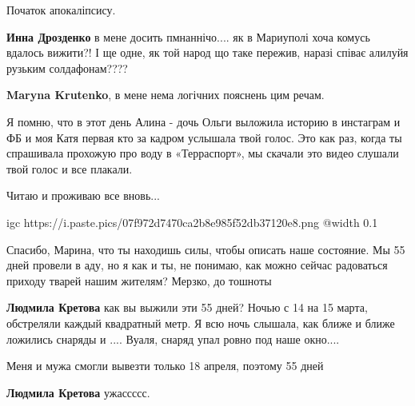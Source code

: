  
 
 
 
 

\qqSecCmt


Початок апокаліпсису.

\begin{itemize} %
\textbf{Инна Дрозденко} в мене досить пмнаннічо.... як в Мариуполі хоча комусь вдалось вижити?! І ще одне, як той народ що таке пережив, наразі співає алилуйя рузьким солдафонам????

\textbf{Maryna Krutenko}, в мене нема логічних пояснень цим речам.
\end{itemize} %


Я помню, что в этот день Алина - дочь Ольги выложила историю в инстаграм и ФБ и
моя Катя первая кто за кадром услышала твой голос. Это как раз, когда ты
спрашивала прохожую про воду в «Терраспорт», мы скачали это видео слушали твой
голос и все плакали.


Читаю и проживаю все вновь...


\ifcmt
  igc https://i.paste.pics/07f972d7470ca2b8e985f52db37120e8.png
	@width 0.1
\fi


Спасибо, Марина, что ты находишь силы, чтобы описать наше состояние. Мы 55 дней
провели в аду, но я как и ты, не понимаю, как можно сейчас радоваться приходу
тварей нашим жителям? Мерзко, до тошноты

\begin{itemize} %
\textbf{Людмила Кретова} как вы выжили эти 55 дней? Ночью с 14 на 15 марта, обстреляли каждый квадратный метр. Я всю ночь слышала, как ближе и ближе ложились снаряды и .... Вуаля, снаряд упал ровно под наше окно....


Меня и мужа смогли вывезти только 18 апреля, поэтому 55 дней

\textbf{Людмила Кретова} ужассссс.

\end{itemize} %

